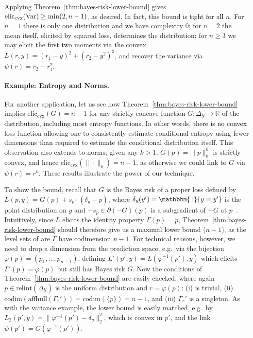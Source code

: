 \documentclass{article}
\newcommand{\reals}{\mathbb{R}}
\newcommand{\simplex}{\Delta_\Y}
\newcommand{\relint}[1]{\mathrm{relint}(#1)}
\newcommand{\eliccvx}{\mathrm{elic}_\mathrm{cvx}}
\newcommand{\codim}{\mathrm{codim}}
\newcommand{\affhull}{\mathrm{affhull}}
\newcommand{\Y}{\mathcal{Y}}
\newcommand{\ones}{\mathbbm{1}}
\begin{document}
Applying Theorem~\ref{thm:bayes-risk-lower-bound} gives $\eliccvx(\Var) \geq \min(2,n-1)$, as desired.
In fact, this bound is tight for all $n$.
For $n=1$ there is only one distribution and we have complexity $0$; for $n=2$ the mean itself, elicited by squared loss, determines the distribution; for $n\geq 3$ we may elicit the first two moments via the convex $L(r,y) = (r_1-y)^2 + (r_2-y^2)^2$, and recover the variance via $\psi(r) = r_2-r_1^2$.

\paragraph{Example: Entropy and Norms.}
For another application, let us see how Theorem~\ref{thm:bayes-risk-lower-bound} implies $\eliccvx(G) = n-1$ for any strictly concave function $G:\simplex\to\reals$ of the distribution, including most entropy functions.
In other words, there is no convex loss function allowing one to consistently estimate conditional entropy using fewer dimensions than required to estimate the conditional distribution itself.
This observation also extends to norms; given any $k>1$, $G(p) = \|p\|_k^k$ is strictly convex, and hence $\eliccvx(\|\cdot\|_k) = n-1$, as otherwise we could link to $G$ via $\psi(r) = r^k$.
These results illustrate the power of our technique.

To show the bound, recall that $G$ is the Bayes risk of a proper loss defined by $L(p,y) = G(p) + s_p \cdot (\delta_y - p)$, where $\delta_y(y') = \ones\{y=y'\}$ is the point distribution on $y$ and $-s_p \in \partial (-G)(p)$ is a subgradient of $-G$ at $p$~\citep{gneiting2007strictly,reid2009surrogate,frongillo2014general}.
Intuitively, since $L$ elicits the identity property $\Gamma(p)=p$, Theorem~\ref{thm:bayes-risk-lower-bound} should therefore give us a maximal lower bound ($n-1$), as the level sets of are $\Gamma$ have codimension $n-1$.
For technical reasons, however, we need to drop a dimension from the prediction space, e.g.\ via the bijection $\varphi(p) = (p_1,\ldots,p_{n-1})$, defining $L'(p',y) = L(\varphi^{-1}(p'),y)$ which elicits $\Gamma'(p) = \varphi(p)$ but still has Bayes risk $G$.
Now the conditions of Theorem~\ref{thm:bayes-risk-lower-bound} are easily checked, where again $p\in\relint\simplex$ is the uniform distribution and $r=\varphi(p)$: (i) is trivial, (ii) $\codim(\affhull(\Gamma_r')) = \codim(\{p\}) = n-1$, and (iii) $\Gamma_r'$ is a singleton.
As with the variance example, the lower bound is easily matched, e.g.\ by $L_2(p',y) = \|\varphi^{-1}(p')-\delta_y\|_2^2$, which is convex in $p'$, and the link $\psi(p') = G(\varphi^{-1}(p'))$.
\end{document}
